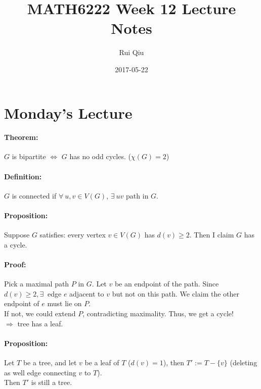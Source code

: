 \documentclass[a4paper, 11pt, twoside]{article}
\begin{document}
\title{MATH6222 Week 12 Lecture Notes}
\author{Rui Qiu}
\date{2017-05-22}

\maketitle

\section{Monday's Lecture}

\paragraph{Theorem:} $G$ is bipartite $\iff$ $G$ has no odd cycles. ($\chi(G)=2$)

\paragraph{Definition:} $G$ is connected if $\forall\ u, v \in V(G)$, $\exists\ uv$ path in $G$.

\paragraph{Proposition:} Suppose $G$ satisfies: every vertex $v\in V(G)$ has $d(v)\geq 2$. Then I claim $G$ has a cycle.

\paragraph{Proof:} Pick a maximal path $P$ in $G$. Let $v$ be an endpoint of the path. Since $d(v)\geq 2,\exists\ $ edge $e$ adjacent to $v$ but not on this path. We claim the other endpoint of $e$ must lie on $P$.\\

If not, we could extend $P$, contradicting maximality. Thus, we get a cycle!\\

$\Longrightarrow$ tree has a leaf.\\

\paragraph{Proposition:} Let $T$ be a tree, and let $v$ be a leaf of $T$ ($d(v)=1$), then $T':=T-\{v\}$ (deleting as well edge connecting $v$ to $T$).\\

Then $T'$ is still a tree.\\
\end{document}

